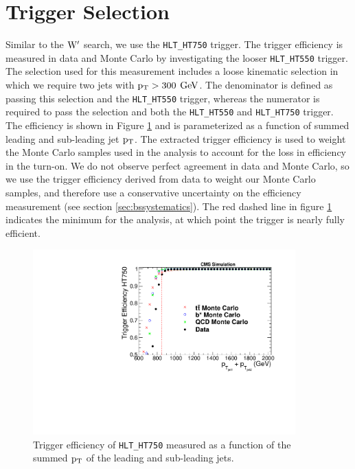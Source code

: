 \section{Trigger Selection}
\label{sec:bstrigger}
Similar to the $\mathrm{W}^{\prime}$ search, we use the \texttt{HLT\_HT750} trigger. 
The trigger efficiency is measured in data and Monte Carlo by investigating the looser \texttt{HLT\_HT550} trigger.  The selection used for this measurement includes a 
loose kinematic selection in which we require two jets with $\mathrm{p_{T}} > 300$ $\mathrm{GeV}$.
The denominator is defined as passing this selection and the \texttt{HLT\_HT550} trigger, whereas the 
numerator is required to pass the selection and both the \texttt{HLT\_HT550} and \texttt{HLT\_HT750} trigger.  
The efficiency is shown in Figure \ref{figs:bsTrigger_Comparison_Ht} and is parameterized as a function of summed leading and sub-leading jet $\mathrm{p_{T}}$.  The extracted trigger efficiency is used to weight 
the Monte Carlo samples used in the analysis to account for the loss in efficiency in the turn-on.  We do not observe perfect agreement in data and Monte Carlo, 
so we use the trigger efficiency derived from data to weight our Monte Carlo samples, and therefore use a conservative uncertainty on the efficiency measurement (see section \ref{sec:bssystematics}).  
The red dashed line in figure \ref{figs:bsTrigger_Comparison_Ht} indicates the minimum for the analysis, 
at which point the trigger is nearly fully efficient.

\begin{figure}[htcb]
\centering
\includegraphics[width=0.9\textwidth]{AN-14-049/figs/Trigger_Comparison_Htdijet.pdf}
\caption{Trigger efficiency of \texttt{HLT\_HT750} measured as a function of the summed $\mathrm{p_{T}}$ of the leading and sub-leading jets.  }
\label{figs:bsTrigger_Comparison_Ht}
\end{figure}

